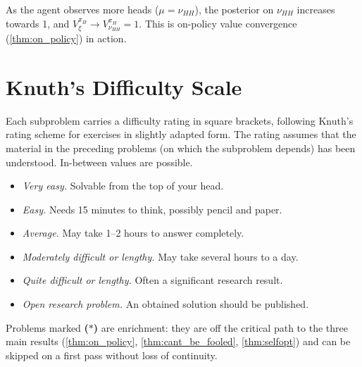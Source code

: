 \documentclass[fontsize=11pt, parskip=half]{scrartcl}
\theoremstyle{definition}
\begin{document}
As the agent observes more heads ($\mu = \nu_{HH}$), the posterior on $\nu_{HH}$ increases towards 1, and $V_\xi^{\pi_H} \to V_{\nu_{HH}}^{\pi_H} = 1$. This is on-policy value convergence (\cref{thm:on_policy}) in action.


\section{Knuth's Difficulty Scale}\label{sec:appendix_difficulty}

Each subproblem carries a difficulty rating in square brackets, following Knuth's rating scheme for exercises \cite{Knuth:73a} in slightly adapted form. The rating assumes that the material in the preceding problems (on which the subproblem depends) has been understood. In-between values are possible.

\begin{itemize}\itemsep=2pt
    \item[\textbf{[00]}] \emph{Very easy.} Solvable from the top of your head.
    \item[\textbf{[10]}] \emph{Easy.} Needs 15 minutes to think, possibly pencil and paper.
    \item[\textbf{[20]}] \emph{Average.} May take 1--2 hours to answer completely.
    \item[\textbf{[30]}] \emph{Moderately difficult or lengthy.} May take several hours to a day.
    \item[\textbf{[40]}] \emph{Quite difficult or lengthy.} Often a significant research result.
    \item[\textbf{[50]}] \emph{Open research problem.} An obtained solution should be published.
\end{itemize}

Problems marked \textbf{($\ast$)} are enrichment: they are off the critical path to the three main results (\cref{thm:on_policy}, \cref{thm:cant_be_fooled}, \cref{thm:selfopt}) and can be skipped on a first pass without loss of continuity.


\clearpage


\end{document}
